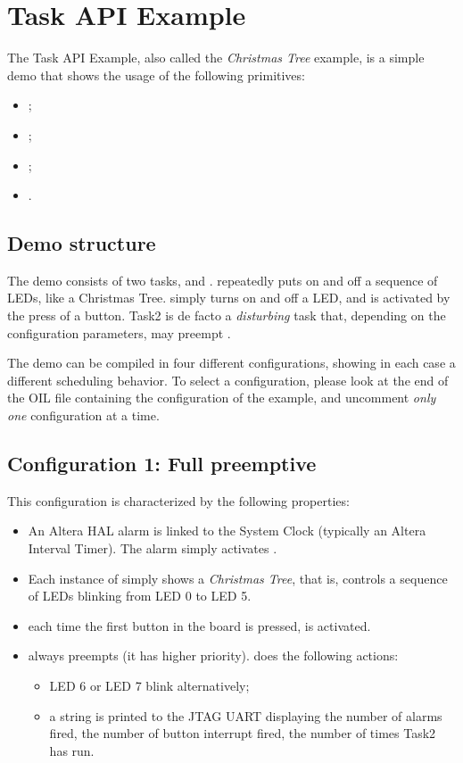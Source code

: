 \chapter{Task API Example}
\label{cha:taskapi}

The Task API Example, also called the {\em Christmas Tree} example, is
a simple demo that shows the usage of the following primitives:
\begin{itemize}
\item {};
\item {};
\item {};
\item {}.
\end{itemize}



\section{Demo structure}

The demo consists of two tasks,  and .
 repeatedly puts on and off a sequence of LEDs, like a
Christmas Tree.  simply turns on and off a LED, and is
activated by the press of a button. Task2 is de facto a {\em
  disturbing} task that, depending on the configuration parameters,
may preempt .

The demo can be compiled in four different configurations, showing in
each case a different scheduling behavior. To select a configuration,
please look at the end of the OIL file containing the configuration of
the example, and uncomment {\em only one} configuration at a time.

\section{Configuration 1: Full preemptive}

This configuration is characterized by the following properties:
\begin{itemize}
\item An Altera HAL alarm  is linked to the
  System Clock (typically an Altera Interval Timer). The alarm simply
  activates .
\item Each instance of  simply shows a {\em Christmas Tree},
  that is,  controls a sequence of LEDs blinking from LED 0
  to LED 5.
\item each time the first button in the board is pressed, 
  is activated.
\item {} always preempts  (it has higher
  priority).  does the following actions:
  \begin{itemize}
  \item LED 6 or LED 7 blink alternatively;
  \item a string is printed to the JTAG UART displaying the number of
    alarms fired, the number of button interrupt fired, the number of
    times Task2 has run.
  \end{itemize}
\end{itemize}

